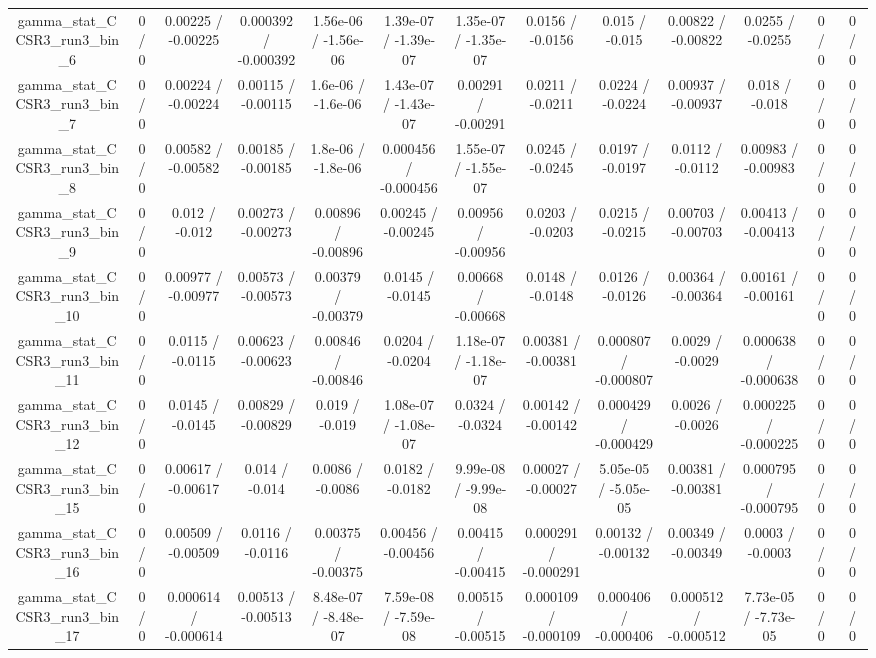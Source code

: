 \documentclass[10pt]{article}
\begin{document}
\begin{table}[htbp]
\begin{center}
\begin{tabular}{|c|c|c|c|c|c|c|c|c|c|c|c|c|}
  gamma_stat_CCSR3_run3_bin_6 & 0 / 0 & 0.00225 / -0.00225 & 0.000392 / -0.000392 & 1.56e-06 / -1.56e-06 & 1.39e-07 / -1.39e-07 & 1.35e-07 / -1.35e-07 & 0.0156 / -0.0156 & 0.015 / -0.015 & 0.00822 / -0.00822 & 0.0255 / -0.0255 & 0 / 0 & 0 / 0 \\ 
  gamma_stat_CCSR3_run3_bin_7 & 0 / 0 & 0.00224 / -0.00224 & 0.00115 / -0.00115 & 1.6e-06 / -1.6e-06 & 1.43e-07 / -1.43e-07 & 0.00291 / -0.00291 & 0.0211 / -0.0211 & 0.0224 / -0.0224 & 0.00937 / -0.00937 & 0.018 / -0.018 & 0 / 0 & 0 / 0 \\ 
  gamma_stat_CCSR3_run3_bin_8 & 0 / 0 & 0.00582 / -0.00582 & 0.00185 / -0.00185 & 1.8e-06 / -1.8e-06 & 0.000456 / -0.000456 & 1.55e-07 / -1.55e-07 & 0.0245 / -0.0245 & 0.0197 / -0.0197 & 0.0112 / -0.0112 & 0.00983 / -0.00983 & 0 / 0 & 0 / 0 \\ 
  gamma_stat_CCSR3_run3_bin_9 & 0 / 0 & 0.012 / -0.012 & 0.00273 / -0.00273 & 0.00896 / -0.00896 & 0.00245 / -0.00245 & 0.00956 / -0.00956 & 0.0203 / -0.0203 & 0.0215 / -0.0215 & 0.00703 / -0.00703 & 0.00413 / -0.00413 & 0 / 0 & 0 / 0 \\ 
  gamma_stat_CCSR3_run3_bin_10 & 0 / 0 & 0.00977 / -0.00977 & 0.00573 / -0.00573 & 0.00379 / -0.00379 & 0.0145 / -0.0145 & 0.00668 / -0.00668 & 0.0148 / -0.0148 & 0.0126 / -0.0126 & 0.00364 / -0.00364 & 0.00161 / -0.00161 & 0 / 0 & 0 / 0 \\ 
  gamma_stat_CCSR3_run3_bin_11 & 0 / 0 & 0.0115 / -0.0115 & 0.00623 / -0.00623 & 0.00846 / -0.00846 & 0.0204 / -0.0204 & 1.18e-07 / -1.18e-07 & 0.00381 / -0.00381 & 0.000807 / -0.000807 & 0.0029 / -0.0029 & 0.000638 / -0.000638 & 0 / 0 & 0 / 0 \\ 
  gamma_stat_CCSR3_run3_bin_12 & 0 / 0 & 0.0145 / -0.0145 & 0.00829 / -0.00829 & 0.019 / -0.019 & 1.08e-07 / -1.08e-07 & 0.0324 / -0.0324 & 0.00142 / -0.00142 & 0.000429 / -0.000429 & 0.0026 / -0.0026 & 0.000225 / -0.000225 & 0 / 0 & 0 / 0 \\ 
  gamma_stat_CCSR3_run3_bin_15 & 0 / 0 & 0.00617 / -0.00617 & 0.014 / -0.014 & 0.0086 / -0.0086 & 0.0182 / -0.0182 & 9.99e-08 / -9.99e-08 & 0.00027 / -0.00027 & 5.05e-05 / -5.05e-05 & 0.00381 / -0.00381 & 0.000795 / -0.000795 & 0 / 0 & 0 / 0 \\ 
  gamma_stat_CCSR3_run3_bin_16 & 0 / 0 & 0.00509 / -0.00509 & 0.0116 / -0.0116 & 0.00375 / -0.00375 & 0.00456 / -0.00456 & 0.00415 / -0.00415 & 0.000291 / -0.000291 & 0.00132 / -0.00132 & 0.00349 / -0.00349 & 0.0003 / -0.0003 & 0 / 0 & 0 / 0 \\ 
  gamma_stat_CCSR3_run3_bin_17 & 0 / 0 & 0.000614 / -0.000614 & 0.00513 / -0.00513 & 8.48e-07 / -8.48e-07 & 7.59e-08 / -7.59e-08 & 0.00515 / -0.00515 & 0.000109 / -0.000109 & 0.000406 / -0.000406 & 0.000512 / -0.000512 & 7.73e-05 / -7.73e-05 & 0 / 0 & 0 / 0 \\ 

\end{tabular}
\end{center}
\end{table}
\end{document}
